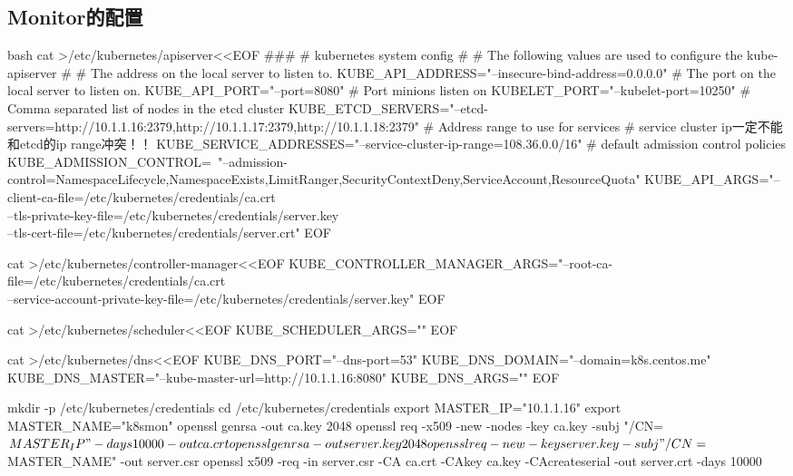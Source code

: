\subsection{Monitor的配置}
\begin{code-block}{bash}
cat >/etc/kubernetes/apiserver<<EOF
###
# kubernetes system config
#
# The following values are used to configure the kube-apiserver
#
# The address on the local server to listen to.
KUBE_API_ADDRESS="--insecure-bind-address=0.0.0.0"
# The port on the local server to listen on.
KUBE_API_PORT="--port=8080"
# Port minions listen on
KUBELET_PORT="--kubelet-port=10250"
# Comma separated list of nodes in the etcd cluster
KUBE_ETCD_SERVERS="--etcd-servers=http://10.1.1.16:2379,http://10.1.1.17:2379,http://10.1.1.18:2379"
# Address range to use for services
# service cluster ip一定不能和etcd的ip range冲突！！
KUBE_SERVICE_ADDRESSES="--service-cluster-ip-range=108.36.0.0/16"
# default admission control policies
KUBE_ADMISSION_CONTROL=\
"--admission-control=NamespaceLifecycle,NamespaceExists,LimitRanger,SecurityContextDeny,ServiceAccount,ResourceQuota"
KUBE_API_ARGS="--client-ca-file=/etc/kubernetes/credentials/ca.crt \\
               --tls-private-key-file=/etc/kubernetes/credentials/server.key \\
               --tls-cert-file=/etc/kubernetes/credentials/server.crt"
EOF

cat >/etc/kubernetes/controller-manager<<EOF
KUBE_CONTROLLER_MANAGER_ARGS="--root-ca-file=/etc/kubernetes/credentials/ca.crt \\
    --service-account-private-key-file=/etc/kubernetes/credentials/server.key"
EOF

cat >/etc/kubernetes/scheduler<<EOF
KUBE_SCHEDULER_ARGS=""
EOF

cat >/etc/kubernetes/dns<<EOF
KUBE_DNS_PORT="--dns-port=53"
KUBE_DNS_DOMAIN="--domain=k8s.centos.me"
KUBE_DNS_MASTER="--kube-master-url=http://10.1.1.16:8080"
KUBE_DNS_ARGS=""
EOF

mkdir -p /etc/kubernetes/credentials
cd /etc/kubernetes/credentials
export MASTER_IP="10.1.1.16"
export MASTER_NAME="k8smon"
openssl genrsa -out ca.key 2048
openssl req -x509 -new -nodes -key ca.key -subj "/CN=${MASTER_IP}" -days 10000 -out ca.crt
openssl genrsa -out server.key 2048
openssl req -new -key server.key -subj "/CN=${MASTER_NAME}" -out server.csr
openssl x509 -req -in server.csr -CA ca.crt -CAkey ca.key -CAcreateserial -out server.crt -days 10000


\end{code-block}
